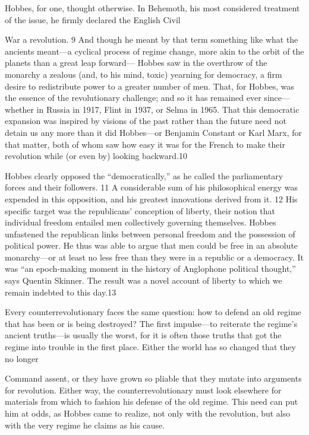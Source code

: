  \par 
Hobbes, for one, thought otherwise. In Behemoth, his most considered treatment of the issue, he firmly declared the English Civil
 \par 
War a revolution. {\color{blue}9} And though he meant by that term something like what the ancients meant—a cyclical process of regime change, more akin to the orbit of the planets than a great leap forward— Hobbes saw in the overthrow of the monarchy a zealous (and, to his mind, toxic) yearning for democracy, a firm desire to redistribute power to a greater number of men. That, for Hobbes, was the essence of the revolutionary challenge; and so it has remained ever since—whether in Russia in 1917, Flint in 1937, or Selma in 1965. That this democratic expansion was inspired by visions of the past rather than the future need not detain us any more than it did Hobbes—or Benjamin Constant or Karl Marx, for that matter, both of whom saw how easy it was for the French to make their revolution while (or even by) looking backward.{\color{blue}10}
 \par 
Hobbes clearly opposed the “democratically,” as he called the parliamentary forces and their followers. {\color{blue}11} A considerable sum of his philosophical energy was expended in this opposition, and his greatest innovations derived from it. {\color{blue}12} His specific target was the republicans’ conception of liberty, their notion that individual freedom entailed men collectively governing themselves. Hobbes unfastened the republican links between personal freedom and the possession of political power. He thus was able to argue that men could be free in an absolute monarchy—or at least no less free than they were in a republic or a democracy. It was “an epoch-making moment in the history of Anglophone political thought,” says Quentin Skinner. The result was a novel account of liberty to which we remain indebted to this day.{\color{blue}13}
 \par 
Every counterrevolutionary faces the same question: how to defend an old regime that has been or is being destroyed? The first impulse—to reiterate the regime’s ancient truths—is usually the worst, for it is often those truths that got the regime into trouble in the first place. Either the world has so changed that they no longer
 \par 
Command assent, or they have grown so pliable that they mutate into arguments for revolution. Either way, the counterrevolutionary must look elsewhere for materials from which to fashion his defense of the old regime. This need can put him at odds, as Hobbes came to realize, not only with the revolution, but also with the very regime he claims as his cause.
